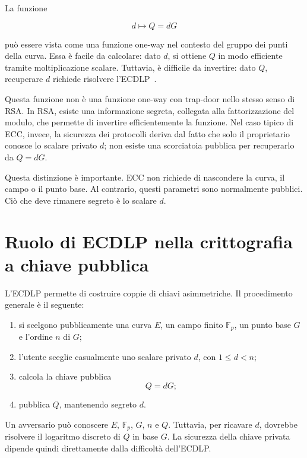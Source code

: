 \documentclass[12pt,a4paper,oneside]{report}
\begin{document}
La funzione

\begin{equation}
    d \longmapsto Q=dG
\end{equation}

può essere vista come una funzione one-way nel contesto del gruppo dei punti della curva. Essa è facile da calcolare: dato \(d\), si ottiene \(Q\) in modo efficiente tramite moltiplicazione scalare. Tuttavia, è difficile da invertire: dato \(Q\), recuperare \(d\) richiede risolvere l'ECDLP~\cite{margara_ec,margara_complessita,sec1}.

Questa funzione non è una funzione one-way con trap-door nello stesso senso di RSA. In RSA, esiste una informazione segreta, collegata alla fattorizzazione del modulo, che permette di invertire efficientemente la funzione. Nel caso tipico di ECC, invece, la sicurezza dei protocolli deriva dal fatto che solo il proprietario conosce lo scalare privato \(d\); non esiste una scorciatoia pubblica per recuperarlo da \(Q=dG\).

Questa distinzione è importante. ECC non richiede di nascondere la curva, il campo o il punto base. Al contrario, questi parametri sono normalmente pubblici. Ciò che deve rimanere segreto è lo scalare \(d\).

\section{Ruolo di ECDLP nella crittografia a chiave pubblica}

L'ECDLP permette di costruire coppie di chiavi asimmetriche. Il procedimento generale è il seguente:

\begin{enumerate}
    \item si scelgono pubblicamente una curva \(E\), un campo finito \(\mathbb{F}_p\), un punto base \(G\) e l'ordine \(n\) di \(G\);
    \item l'utente sceglie casualmente uno scalare privato \(d\), con \(1 \leq d < n\);
    \item calcola la chiave pubblica
    \[
    Q=dG;
    \]
    \item pubblica \(Q\), mantenendo segreto \(d\).
\end{enumerate}

Un avversario può conoscere \(E\), \(\mathbb{F}_p\), \(G\), \(n\) e \(Q\). Tuttavia, per ricavare \(d\), dovrebbe risolvere il logaritmo discreto di \(Q\) in base \(G\). La sicurezza della chiave privata dipende quindi direttamente dalla difficoltà dell'ECDLP.
\end{document}
